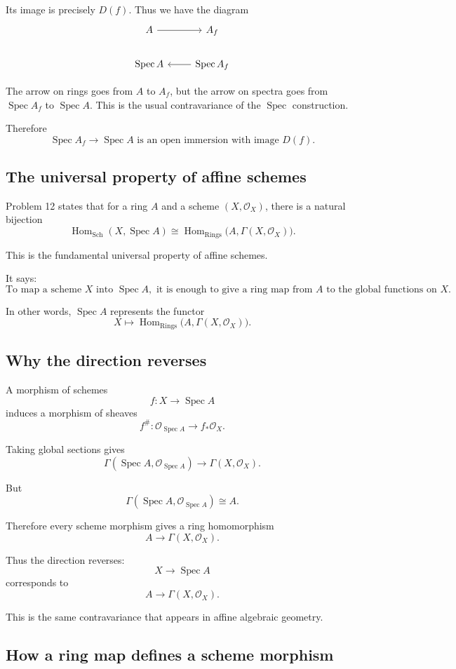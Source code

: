 \documentclass[12pt,a4paper]{article}
\DeclareMathOperator{\Hom}{Hom}
\newcommand{\OO}{\mathcal{O}}
\newcommand{\Spec}{\operatorname{Spec}}
\newcommand{\Sch}{\mathrm{Sch}}
\newcommand{\Rings}{\mathrm{Rings}}
\theoremstyle{notespace}
\begin{document}
Its image is precisely \(D(f)\). Thus we have the diagram
\[
\begin{tikzcd}
	A \arrow[r] & A_f \\
	\Spec A & \Spec A_f \arrow[l]
\end{tikzcd}
\]

The arrow on rings goes from \(A\) to \(A_f\), but the arrow on spectra goes from \(\Spec A_f\) to \(\Spec A\). This is the usual contravariance of the \(\Spec\) construction.

Therefore
\[
\boxed{
	\Spec A_f\to\Spec A
	\text{ is an open immersion with image }D(f).
}
\]

\subsection{The universal property of affine schemes}

Problem 12 states that for a ring \(A\) and a scheme \((X,\OO_X)\), there is a natural bijection
\[
\Hom_{\Sch}(X,\Spec A)
\cong
\Hom_{\Rings}\bigl(A,\Gamma(X,\OO_X)\bigr).
\]

This is the fundamental universal property of affine schemes.

It says:
\[
\boxed{
	\text{To map a scheme }X\text{ into }\Spec A,
	\text{ it is enough to give a ring map from }A
	\text{ to the global functions on }X.
}
\]

In other words, \(\Spec A\) represents the functor
\[
X\longmapsto
\Hom_{\Rings}\bigl(A,\Gamma(X,\OO_X)\bigr).
\]

\subsection{Why the direction reverses}

A morphism of schemes
\[
f:X\to\Spec A
\]
induces a morphism of sheaves
\[
f^\#:\OO_{\Spec A}\to f_*\OO_X.
\]

Taking global sections gives
\[
\Gamma(\Spec A,\OO_{\Spec A})
\longrightarrow
\Gamma(X,\OO_X).
\]

But
\[
\Gamma(\Spec A,\OO_{\Spec A})\cong A.
\]

Therefore every scheme morphism gives a ring homomorphism
\[
A\to\Gamma(X,\OO_X).
\]

Thus the direction reverses:
\[
X\to\Spec A
\]
corresponds to
\[
A\to\Gamma(X,\OO_X).
\]

This is the same contravariance that appears in affine algebraic geometry.

\subsection{How a ring map defines a scheme morphism}
\end{document}

